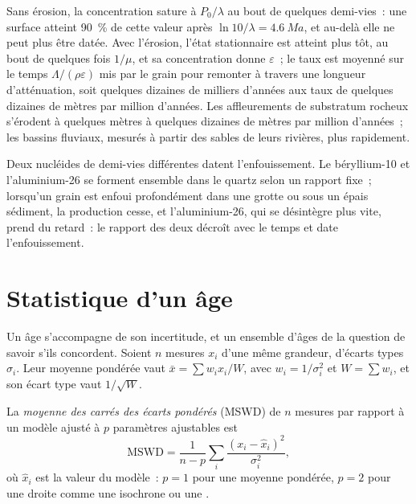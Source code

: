 Sans érosion, la concentration sature à $P_0/\lambda$ au bout de quelques
demi-vies~: une surface atteint \qty{90}{\percent} de cette valeur après $\ln 10/\lambda
= \qty{4.6}{Ma}$, et au-delà elle ne peut plus être datée. Avec l'érosion,
l'état stationnaire est atteint plus tôt, au bout de quelques fois $1/\mu$, et sa
concentration donne $\varepsilon$~; le taux est moyenné sur le temps
$\Lambda/(\rho\varepsilon)$ mis par le grain pour remonter à travers une
longueur d'atténuation, soit quelques dizaines de milliers d'années aux taux de quelques
dizaines de mètres par million d'années. Les affleurements de substratum rocheux s'érodent à quelques mètres
à quelques dizaines de mètres par million d'années~; les bassins fluviaux, mesurés à partir des
sables de leurs rivières, plus rapidement.

Deux nucléides de demi-vies différentes datent l'enfouissement. Le béryllium-10 et
l'aluminium-26 se forment ensemble dans le quartz selon un rapport fixe~; lorsqu'un grain est
enfoui profondément dans une grotte ou sous un épais sédiment, la production cesse, et
l'aluminium-26, qui se désintègre plus vite, prend du retard~: le rapport des deux
décroît avec le temps et date l'enfouissement.

\section{Statistique d'un âge}\label{sec:b3:advanced-geochronology:statistics}

Un âge s'accompagne de son incertitude, et un ensemble d'âges de la question
de savoir s'ils concordent. Soient $n$ mesures $x_i$ d'une même grandeur, d'écarts types
$\sigma_i$. Leur moyenne pondérée vaut $\bar x = \sum w_ix_i/W$, avec
$w_i = 1/\sigma_i^2$ et $W = \sum w_i$, et son écart type vaut
$1/\sqrt W$.

\begin{definition}\label{def:b3:advanced-geochronology:mswd}
La \emph{moyenne des carrés des écarts pondérés}
(MSWD) de $n$ mesures par rapport à un modèle ajusté à $p$ paramètres ajustables
est
\[
\mathrm{MSWD} = \frac{1}{n - p}\sum_i \frac{(x_i - \hat x_i)^2}{\sigma_i^2},
\]
où $\hat x_i$ est la valeur du modèle~: $p = 1$ pour une moyenne pondérée, $p = 2$ pour
une droite comme une isochrone ou une .
\end{definition}

